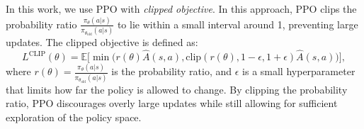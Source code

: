 In this work, we use PPO with \textit{clipped objective}. In this approach, PPO clips the probability ratio $\frac{\pi_\theta(a|s)}{\pi_{\theta_\text{old}}(a|s)}$ to lie within a small interval around 1, preventing large updates. The clipped objective is defined as:
{\small
\[
L^{\text{CLIP}}(\theta) = \mathbb{E} \bigg[ \min \big( r(\theta) \hat{A}(s,a), \text{clip}(r(\theta), 1 - \epsilon, 1 + \epsilon) \hat{A}(s,a) \big) \bigg],
\]
}
%    
where $r(\theta) = \frac{\pi_\theta(a|s)}{\pi_{\theta_\text{old}}(a|s)}$ is the probability ratio, and $\epsilon$ is a small hyperparameter that limits how far the policy is allowed to change. By clipping the probability ratio, PPO discourages overly large updates while still allowing for sufficient exploration of the policy space.


